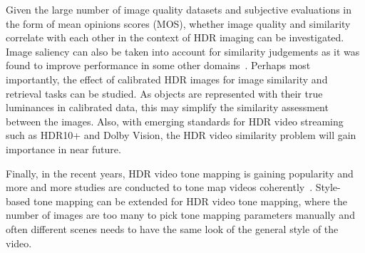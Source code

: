 Given the large number of image quality datasets and subjective evaluations in the form of mean opinions scores (MOS), whether image quality and similarity correlate with each other in the context of HDR imaging can be investigated. Image saliency can also be taken into account for similarity judgements as it was found to improve performance in some other domains~\cite{amirkhani2019inpainted}. Perhaps most importantly, the effect of calibrated HDR images for image similarity and retrieval tasks can be studied. As objects are represented with their true luminances in calibrated data, this may simplify the similarity assessment between the images. Also, with emerging standards for HDR video streaming such as HDR10+ and Dolby Vision, the HDR video similarity problem will gain importance in near future.

Finally, in the recent years, HDR video tone mapping is gaining popularity and more and more studies are conducted to tone map videos coherently~\cite{eilertsen2017comparative}. Style-based tone mapping can be extended for HDR video tone mapping, where the number of images are too many to pick tone mapping parameters manually and often different scenes needs to have the same look of the general style of the video. 
